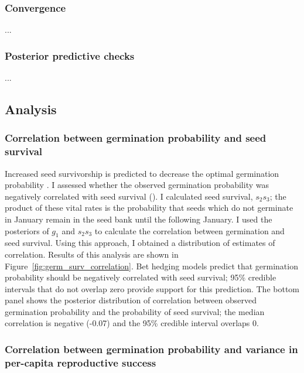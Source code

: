\documentclass[12pt, oneside, titlepage]{article}   	%
\begin{document}
\subsubsection*{Convergence}

...

\subsubsection*{Posterior predictive checks}

...

\subsection*{Analysis}

\subsubsection*{Correlation between germination probability and seed survival}

Increased seed survivorship is predicted to decrease the optimal germination probability \cite{cohen1966,ellner1985a}. I assessed whether the observed germination probability was negatively correlated with seed survival (\cite{gremer2014}). I calculated seed survival, $s_2 s_3$; the product of these vital rates is the probability that seeds which do not germinate in January remain in the seed bank until the following January. I used the posteriors of $g_1$ and $s_2 s_3$ to calculate the correlation between germination and seed survival. Using this approach, I obtained a distribution of estimates of correlation. Results of this analysis are shown in Figure~\ref{fig:germ_surv_correlation}. Bet hedging models predict that germination probability should be negatively correlated with seed survival; 95\% credible intervals that do not overlap zero provide support for this prediction. The bottom panel shows the posterior distribution of correlation between observed germination probability and the probability of seed survival; the median correlation is negative (-0.07) and the 95\% credible interval overlaps 0.

\subsubsection*{Correlation between germination probability and variance in per-capita reproductive success}
\end{document}
